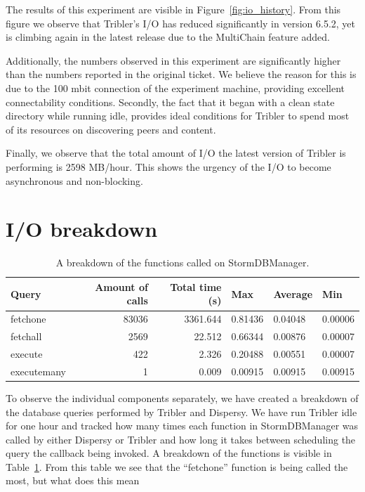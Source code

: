 The results of this experiment are visible in Figure~\ref{fig:io_history}.
From this figure we observe that Tribler's I/O has reduced significantly in version 6.5.2, yet is climbing again in the latest release due to the MultiChain feature added. 

Additionally, the numbers observed in this experiment are significantly higher than the numbers reported in the original ticket.
We believe the reason for this is due to the 100 mbit connection of the experiment machine, providing excellent connectability conditions. 
Secondly, the fact that it began with a clean state directory while running idle, provides ideal conditions for Tribler to spend most of its resources on discovering peers and content.

Finally, we observe that the total amount of I/O the latest version of Tribler is performing is 2598 MB/hour.
This shows the urgency of the I/O to become asynchronous and non-blocking.

\section{I/O breakdown}

\begin{table}[]
	\centering
	\caption{A breakdown of the functions called on StormDBManager.}
	\label{table:breakdown_tribler_idle}
	\begin{tabular}{|l|r|r|l|l|l|}
		\hline
		\textbf{Query}	& \textbf{Amount of calls} & \textbf{Total time (s)} & \textbf{Max}  & \textbf{Average} & \textbf{Min} \\ \hline
		fetchone	& 83036	& 3361.644 	& 0.81436	& 0.04048	& 0.00006 \\ \hline
		fetchall	& 2569	& 22.512	& 0.66344	& 0.00876	& 0.00007 \\ \hline
		execute		& 422	& 2.326  	& 0.20488	& 0.00551	& 0.00007 \\ \hline
		executemany	& 1		& 0.009 	& 0.00915 	& 0.00915	& 0.00915 \\ \hline
	\end{tabular}
\end{table}

To observe the individual components separately, we have created a breakdown of the database queries performed by Tribler and Dispersy.
We have run Tribler idle for one hour and tracked how many times each function in StormDBManager was called by either Dispersy or Tribler and how long it takes between scheduling the query the callback being invoked.
A breakdown of the functions is visible in Table~\ref{table:breakdown_tribler_idle}.
From this table we see that the \enquote{fetchone} function is being called the most, but what does this mean

